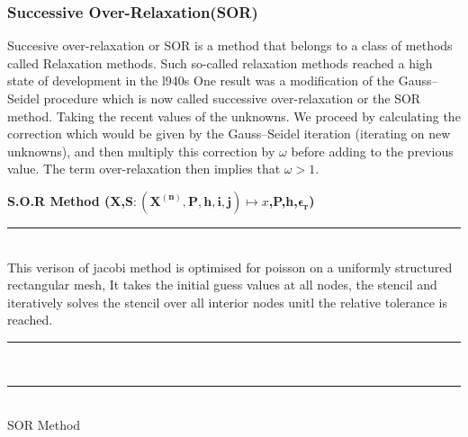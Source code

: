 \subsubsection{Successive Over-Relaxation(SOR)}
Succesive over-relaxation or SOR is a method that belongs to a class of methods called Relaxation methods. Such so-called relaxation methods reached a high state of development in the l940s  One result was a modiﬁcation of the Gauss–Seidel procedure which is now called successive over-relaxation or the SOR method. Taking the recent values of the unknowns. We proceed by calculating the correction which would be given by the Gauss–Seidel iteration (iterating on new unknowns), and then multiply this correction by $\omega$ before adding to the previous value. The term over-relaxation then implies that $\omega>1$. \\[2mm]
\begin{algorithm}[H]
    \textbf{S.O.R Method (X,$\mathbf{S:(X^{(n)},P,h,i,j)} \mapsto x$,P,h,$\mathbf{\epsilon_r}$)}\\[-1pt]
    \par\noindent\rule{\textwidth}{0.4pt} \\
    This verison of jacobi method is optimised for poisson on a uniformly structured rectangular mesh, It takes the initial guess values at all nodes, the stencil and iteratively solves the stencil over all interior nodes unitl the relative tolerance is reached.  \\[2mm]
    \par\noindent\rule{\textwidth}{0.4pt} \\
    \par\noindent\rule{\textwidth}{0.4pt} \\[2mm]
    \caption{SOR Method}
\end{algorithm}                                    
